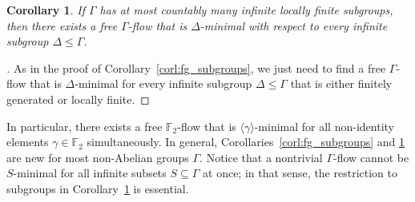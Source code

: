 \documentclass[11pt,reqno,psamsfonts]{amsart}
\theoremstyle{bfnote}
\newtheorem{corl}[theo]{Corollary}
\theoremstyle{definition}
\theoremstyle{remark}
\newcommand{\0}{\varnothing}
\renewcommand{\leq}{\leqslant}
\newcommand{\bemph}[1]{{\normalfont#1}}
\newcommand{\ep}[1]{\bemph{(}#1\bemph{)}}
\newcommand{\emphd}[1]{{\fontseries{b}\selectfont\textsf{#1}}}
\newcommand{\G}{\Gamma}
\numberwithin{equation}{section}
\newenvironment{scproof}[1][]{\begin{proof}[\textsc{\upshape{Proof}}#1]}{\end{proof}}
\begin{document}


    \begin{tcolorbox}
    \begin{corl}\label{corl:no_loc_fin}
        If $\G$ has at most countably many infinite locally finite subgroups, then there exists a free $\G$-flow %
        that is $\Delta$-minimal with respect to every infinite subgroup $\Delta \leq \G$.
    \end{corl}
    \end{tcolorbox}
    \begin{scproof}
        As in the proof of Corollary~\ref{corl:fg_subgroups}, we just need to find a free $\G$-flow %
        that is $\Delta$-minimal for every infinite subgroup $\Delta \leq \G$ that is either finitely generated or locally finite. %
    \end{scproof}

    In particular, there exists a free $\mathbb{F}_2$-flow that is $\langle \gamma \rangle$-minimal for all non-identity elements $\gamma \in \mathbb{F}_2$ simultaneously. In general, Corollaries~\ref{corl:fg_subgroups} and \ref{corl:no_loc_fin} are new %
    for most non-Abelian groups $\G$. %
    Notice that a nontrivial $\G$-flow cannot be $S$-minimal for all infinite subsets $S \subseteq \G$ at once; in that sense, the restriction to subgroups in Corollary~\ref{corl:no_loc_fin} is essential.
\end{document}
